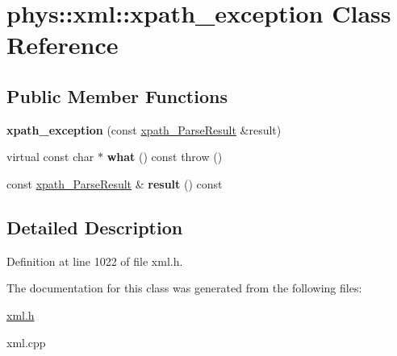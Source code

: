 \hypertarget{classphys_1_1xml_1_1xpath__exception}{
\section{phys::xml::xpath\_\-exception Class Reference}
\label{d1/dcf/classphys_1_1xml_1_1xpath__exception}
}
\subsection*{Public Member Functions}
\begin{DoxyCompactItemize}
\item 
\hypertarget{classphys_1_1xml_1_1xpath__exception_a9d8be277d63d5517bd5e467ff33bd02f}{
{\bfseries xpath\_\-exception} (const \hyperlink{structphys_1_1xml_1_1xpath__ParseResult}{xpath\_\-ParseResult} \&result)}
\label{d1/dcf/classphys_1_1xml_1_1xpath__exception_a9d8be277d63d5517bd5e467ff33bd02f}

\item 
\hypertarget{classphys_1_1xml_1_1xpath__exception_ab36b83bb0bacf37aa0d298f724d2a668}{
virtual const char $\ast$ {\bfseries what} () const   throw ()}
\label{d1/dcf/classphys_1_1xml_1_1xpath__exception_ab36b83bb0bacf37aa0d298f724d2a668}

\item 
\hypertarget{classphys_1_1xml_1_1xpath__exception_ac6a47c84f9d434f0eb5d465e5291c490}{
const \hyperlink{structphys_1_1xml_1_1xpath__ParseResult}{xpath\_\-ParseResult} \& {\bfseries result} () const }
\label{d1/dcf/classphys_1_1xml_1_1xpath__exception_ac6a47c84f9d434f0eb5d465e5291c490}

\end{DoxyCompactItemize}


\subsection{Detailed Description}


Definition at line 1022 of file xml.h.



The documentation for this class was generated from the following files:\begin{DoxyCompactItemize}
\item 
\hyperlink{xml_8h}{xml.h}\item 
xml.cpp\end{DoxyCompactItemize}
